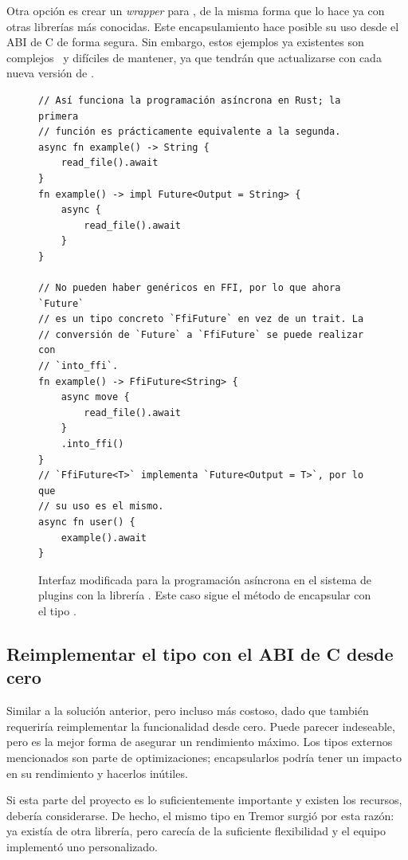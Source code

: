 Otra opción es crear un \emph{wrapper} para , de la misma forma
que lo hace ya \abistable con otras librerías más conocidas. Este
encapsulamiento hace posible su uso desde el ABI de C de forma segura. Sin
embargo, estos ejemplos ya existentes son complejos~\cite{complexwrapper} y
difíciles de mantener, ya que tendrán que actualizarse con cada nueva versión de
.

\begin{figure}
    \centering
    \begin{verbatim}
// Así funciona la programación asíncrona en Rust; la primera
// función es prácticamente equivalente a la segunda.
async fn example() -> String {
    read_file().await
}
fn example() -> impl Future<Output = String> {
    async {
        read_file().await
    }
}

// No pueden haber genéricos en FFI, por lo que ahora `Future`
// es un tipo concreto `FfiFuture` en vez de un trait. La
// conversión de `Future` a `FfiFuture` se puede realizar con
// `into_ffi`.
fn example() -> FfiFuture<String> {
    async move {
        read_file().await
    }
    .into_ffi()
}
// `FfiFuture<T>` implementa `Future<Output = T>`, por lo que
// su uso es el mismo.
async fn user() {
    example().await
}
    \end{verbatim}
    \caption{Interfaz modificada para la programación asíncrona en el sistema de
    plugins con la librería . Este caso sigue el método de
    encapsular  con el tipo .}%
    \label{fig:async_ffi}
\end{figure}

\subsection{Reimplementar el tipo con el ABI de C desde cero}

Similar a la solución anterior, pero incluso más costoso, dado que también
requeriría reimplementar la funcionalidad desde cero. Puede parecer indeseable,
pero es la mejor forma de asegurar un rendimiento máximo. Los tipos externos
mencionados son parte de optimizaciones; encapsularlos podría tener un impacto
en su rendimiento y hacerlos inútiles.

Si esta parte del proyecto es lo suficientemente importante y existen los
recursos, debería considerarse. De hecho, el mismo tipo  en Tremor
surgió por esta razón: ya existía  de otra librería, pero
carecía de la suficiente flexibilidad y el equipo implementó uno personalizado.

